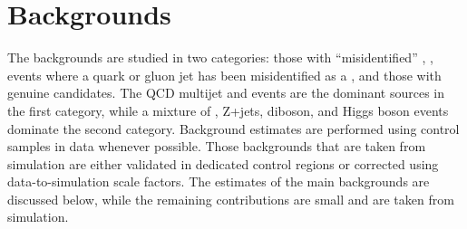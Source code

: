 \section{Backgrounds}
\label{sect:bkg}
The backgrounds are studied in two categories: those with
``misidentified'' \Tau, \ie, events where a quark or gluon jet has been misidentified
as a \Tau, and those with genuine \Tau candidates.
The QCD multijet and \wjets events are the dominant sources in the first category, while a mixture of \ttbar, Z+jets, diboson, and Higgs boson
events dominate the second category. Background estimates are performed using control samples in data whenever possible.
Those backgrounds that are taken from simulation are either validated in dedicated control regions or corrected using data-to-simulation scale factors.
The estimates of the main backgrounds are discussed below, while the remaining contributions are small and are taken from simulation.


